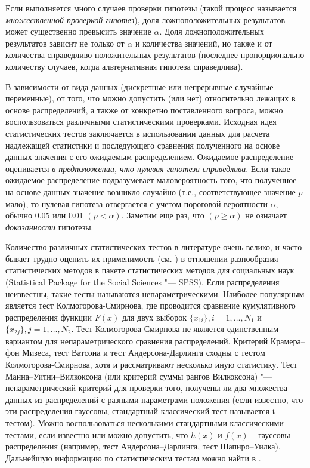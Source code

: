 Если выполняется много случаев проверки гипотезы (такой процесс называется \textit{множественной проверкой гипотез}), 
доля ложноположительных результатов может существенно превысить значение $\alpha$. Доля ложноположительных результатов 
зависит не только от $\alpha$ и количества значений, но также и от количества справедливо положительных результатов 
(последнее пропорционально количеству случаев, когда альтернативная гипотеза справедлива). 

В зависимости от вида данных (дискретные или непрерывные случайные переменные), от того, что можно допустить (или нет) 
относительно лежащих в основе распределений, а также от конкретно поставленного вопроса, можно воспользоваться 
различными статистическими проверками. Исходная идея статистических тестов заключается в использовании данных для 
расчета надлежащей статистики и последующего сравнения полученного на основе данных значения с его ожидаемым 
распределением. Ожидаемое распределение оценивается \textit{в предположении, что нулевая гипотеза справедлива}. 
Если такое ожидаемое распределение подразумевает маловероятность того, что полученное на основе данных значение 
возникло случайно (т.е., соответствующее значение $p$ мало), то нулевая гипотеза отвергается с учетом пороговой 
вероятности $\alpha$, обычно 0.05 или 0.01 $(p < \alpha)$. Заметим еще раз, что $(p \geq \alpha)$ не означает 
\textit{доказанности} гипотезы.

Количество различных статистических тестов в литературе очень велико, и часто бывает трудно оценить их применимость 
(см. \cite{field2013discovering, wagner2019using}) в отношении разнообразия статистических методов в пакете 
статистических методов для социальных наук (Statistical Package for the Social Sciences "--- SPSS). Если распределения 
неизвестны, такие тесты называются непараметрическими. Наиболее популярным является тест Колмогорова-Смирнова, где 
проводится сравнение кумулятивного распределения функции $F(x)$ для двух выборок $\{x_{1i}\}, i = 1, \ldots, N_1$ и 
$\{x_{2j}\}, j = 1, \ldots, N_2$. Тест Колмогорова-Смирнова не является единственным вариантом для непараметрического 
сравнения распределений. Критерий Крамера–фон Мизеса, тест Ватсона и тест Андерсона-Дарлинга сходны с тестом 
Колмогорова-Смирнова, хотя и рассматривают несколько иную статистику. Тест Манна–Уитни–Вилкоксона (или критерий 
суммы рангов Вилкоксона) "--- непараметрический критерий для проверки того, получены ли два множества данных из 
распределений с разными параметрами положения (если известно, что эти распределения гауссовы, стандартный классический 
тест называется t-тестом). Можно воспользоваться несколькими стандартными классическими тестами, если известно или 
можно допустить, что $h(x)$ и $f(x)$ – гауссовы распределения (например, тест Андерсона–Дарлинга, тест Шапиро–Уилка). 
Дальнейшую информацию по статистическим тестам можно найти в \cite{ivezic2019statistics, field2013discovering, 
wagner2019using}.

